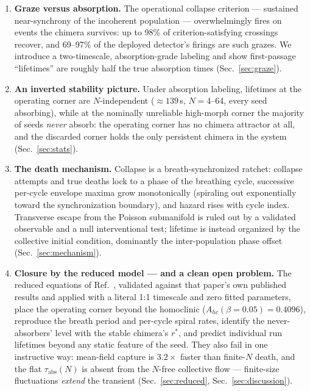 \documentclass[11pt]{article}
\begin{document}
\begin{enumerate}
\item \textbf{Graze versus absorption.} The operational collapse criterion ---
sustained near-synchrony of the incoherent population --- overwhelmingly fires on
events the chimera survives: up to 98\% of criterion-satisfying crossings recover,
and 69--97\% of the deployed detector's firings are such grazes. We introduce a
two-timescale, absorption-grade labeling and show first-passage ``lifetimes'' are
roughly half the true absorption times (Sec.~\ref{sec:graze}).
\item \textbf{An inverted stability picture.} Under absorption labeling, lifetimes at
the operating corner are $N$-independent ($\approx 139$\,s, $N = 4$--$64$, every seed
absorbing), while at the nominally unreliable high-morph corner the majority of seeds
\emph{never} absorb: the operating corner has no chimera attractor at all, and the
discarded corner holds the only persistent chimera in the system
(Sec.~\ref{sec:stats}).
\item \textbf{The death mechanism.} Collapse is a breath-synchronized ratchet:
collapse attempts and true deaths lock to a phase of the breathing cycle, successive
per-cycle envelope maxima grow monotonically (spiraling out exponentially toward the
synchronization boundary), and hazard rises with cycle index. Transverse escape from
the Poisson submanifold is ruled out by a validated observable and a null
interventional test; lifetime is instead organized by the collective initial
condition, dominantly the inter-population phase offset (Sec.~\ref{sec:mechanism}).
\item \textbf{Closure by the reduced model --- and a clean open problem.} The reduced
equations of Ref.~\cite{abrams2008}, validated against that paper's own published
results and applied with a literal 1:1 timescale and zero fitted parameters, place
the operating corner beyond the homoclinic ($A_{hc}(\beta{=}0.05) = 0.4096$),
reproduce the breath period and per-cycle spiral rates, identify the never-absorbers'
level with the stable chimera's $r^*$, and predict individual run lifetimes beyond
any static feature of the seed. They also fail in one instructive way: mean-field
capture is $3.2\times$ faster than finite-$N$ death, and the flat
$\tau_{\mathrm{abs}}(N)$ is absent from the $N$-free collective flow --- finite-size
fluctuations \emph{extend} the transient (Sec.~\ref{sec:reduced},
Sec.~\ref{sec:discussion}).
\end{enumerate}
\end{document}
